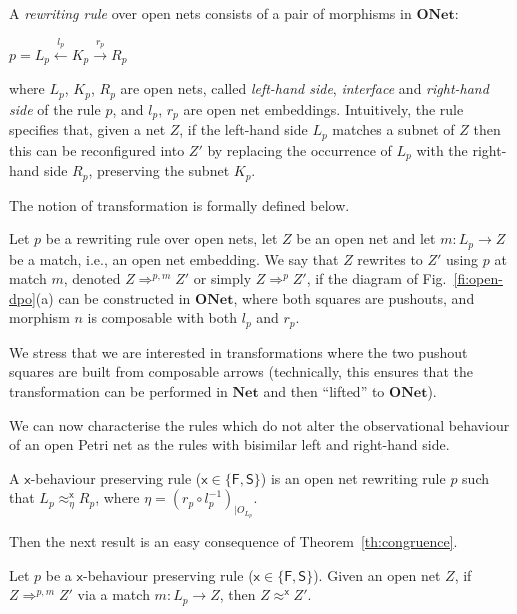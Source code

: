 \documentclass{LMCS}
\newcommand{\onet}{\ensuremath{\mathbf{ONet}}}
\newcommand{\net}{\ensuremath{\mathbf{Net}}}
\newcommand{\rew}[1]{\Rightarrow^{#1}}
\begin{document}
A \emph{rewriting rule} over open nets consists of a pair of morphisms
in $\onet$:
\begin{center}
  $p = L_p \stackrel{l_p}{\leftarrow} K_p \stackrel{r_p}{\rightarrow} R_p$
\end{center}
where $L_p$, $K_p$, $R_p$ are open nets, called \emph{left-hand side},
\emph{interface} and \emph{right-hand side} of the rule $p$, and $l_p$, $r_p$
are open net embeddings.
Intuitively, the rule specifies that, given a net
$Z$, if the left-hand side $L_p$ matches a subnet of $Z$ then this can be
reconfigured into $Z'$ by replacing the occurrence of $L_p$ with the
right-hand side $R_p$, preserving the subnet
$K_p$.

The notion of transformation is formally defined below.

\begin{defi}
\label{de:transformation}
  Let $p$ be a rewriting rule over open nets, let $Z$ be an open net and let
  $m : L_p \to Z$ be a match, i.e., an open net embedding. We say that $Z$
  rewrites to $Z'$ using $p$ at match $m$, denoted $Z \rew{p,m} Z'$ or simply
  $Z \rew{p} Z'$, if the diagram of Fig.~\ref{fi:open-dpo}(a) can be
  constructed in $\onet$,
where both squares are pushouts, and morphism $n$ is 
  composable with both $l_p$ and $r_p$.
\end{defi}
We stress that we are interested in transformations where the two pushout
squares are built from composable arrows (technically, this ensures that the
transformation can be performed in $\net$ and then ``lifted'' to $\onet$).








We can now characterise the rules which do not alter the
observational behaviour of an open Petri net as the rules with
bisimilar left and right-hand side.

\begin{defi}
  \label{de:beh-pres-rule}
  A $\mathsf{x}$-behaviour preserving rule ($\mathsf{x} \in \{
  \mathsf{F}, \mathsf{S} \}$) is an open net rewriting rule $p$ such
  that $L_p \approx^{\mathsf{x}}_\eta R_p$, where $\eta = (r_p \circ
  l_p^{-1})_{|O_{L_p}}$.
\end{defi}


Then the next result is an easy consequence of
Theorem~\ref{th:congruence}.

\begin{thm}
  \label{th:behaviour-preserving-reconfigurations}
  Let $p$ be a $\mathsf{x}$-behaviour preserving rule ($\mathsf{x} \in
  \{ \mathsf{F}, \mathsf{S} \}$).
Given an open net $Z$, if $Z \rew{p,m} Z'$ via a 
match $m :
    L_p \to Z$, then $Z \approx^{\mathsf{x}} Z'$. 
  \end{thm}
\end{document}
